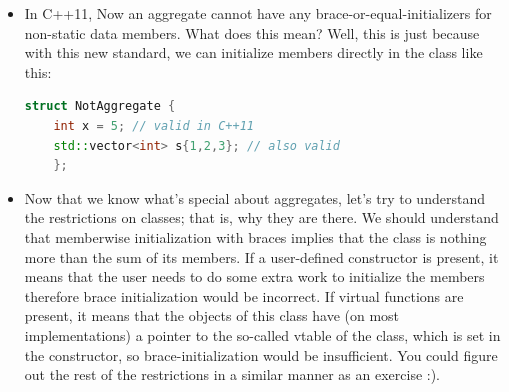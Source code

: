 \documentclass[a4paper,11pt,twoside]{book}
\begin{document}
\begin{itemize}
	\item In C++11, Now an aggregate cannot have any brace-or-equal-initializers for non-static data members. What does this mean? Well, this is just because with this new standard, we can initialize members directly in the class like this:
	\begin{lstlisting}[frame=single, language=c++]
	struct NotAggregate {
	int x = 5; // valid in C++11
	std::vector<int> s{1,2,3}; // also valid
	};
	\end{lstlisting}
	
	
	\item Now that we know what's special about aggregates, let's try to understand the restrictions on classes; that is, why they are there. We should understand that memberwise initialization with braces implies that the class is nothing more than the sum of its members. If a user-defined constructor is present, it means that the user needs to do some extra work to initialize the members therefore brace initialization would be incorrect. If virtual functions are present, it means that the objects of this class have (on most implementations) a pointer to the so-called vtable of the class, which is set in the constructor, so brace-initialization would be insufficient. You could figure out the rest of the restrictions in a similar manner as an exercise :).
	
\end{itemize}
\end{document}
